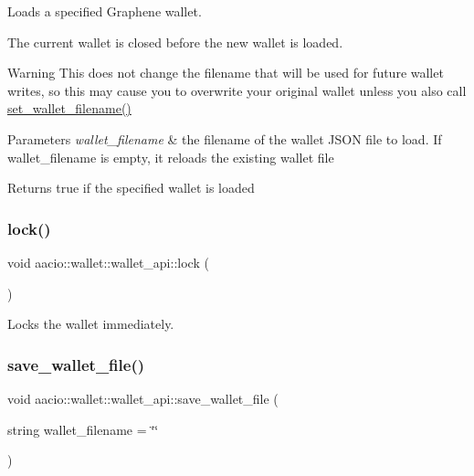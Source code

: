 Loads a specified Graphene wallet.

The current wallet is closed before the new wallet is loaded.

\begin{DoxyWarning}{Warning}
This does not change the filename that will be used for future wallet writes, so this may cause you to overwrite your original wallet unless you also call {\ttfamily \mbox{\hyperlink{classaacio_1_1wallet_1_1wallet__api_a208875f33af3cb0ec88e316c813f0ec8}{set\+\_\+wallet\+\_\+filename()}}} 
\end{DoxyWarning}

\begin{DoxyParams}{Parameters}
{\em wallet\+\_\+filename} & the filename of the wallet J\+S\+ON file to load. If {\ttfamily wallet\+\_\+filename} is empty, it reloads the existing wallet file \\
\hline
\end{DoxyParams}
\begin{DoxyReturn}{Returns}
true if the specified wallet is loaded 
\end{DoxyReturn}
\mbox{\label{classaacio_1_1wallet_1_1wallet__api_a12f7c1fefda15e09c58c6622d9f1a32c}} 
\subsubsection{\texorpdfstring{lock()}{lock()}}
{\footnotesize\ttfamily void aacio\+::wallet\+::wallet\+\_\+api\+::lock (\begin{DoxyParamCaption}{ }\end{DoxyParamCaption})}

Locks the wallet immediately. \mbox{\label{classaacio_1_1wallet_1_1wallet__api_a8fc5732ef94628ef71d52bf244e70172}} 
\subsubsection{\texorpdfstring{save\+\_\+wallet\+\_\+file()}{save\_wallet\_file()}}
{\footnotesize\ttfamily void aacio\+::wallet\+::wallet\+\_\+api\+::save\+\_\+wallet\+\_\+file (\begin{DoxyParamCaption}\item[{string}]{wallet\+\_\+filename = {\ttfamily \char`\"{}\char`\"{}} }\end{DoxyParamCaption})}

